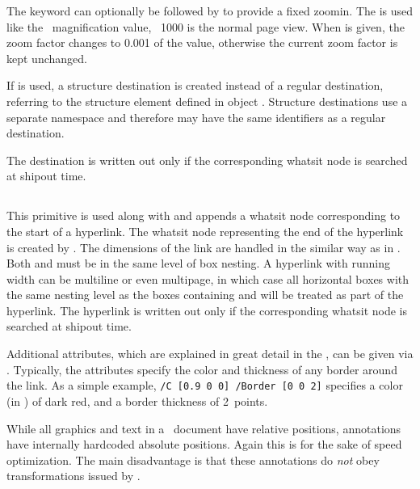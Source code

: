 \documentclass{pdftexmanual}
\begin{document}
The  keyword can optionally be followed by 
 to provide a fixed zoom\hyph in. The
 is used like the \TEX\ magnification value, \ie\
1000 is the normal page view. When   is
given, the zoom factor changes to 0.001 of the \Something{integer}
value, otherwise the current zoom factor is kept unchanged.

If   is used, a structure destination
is created instead of a regular destination, referring to the structure
element defined in object \Something{number}. Structure destinations use
a separate namespace and therefore may have the same identifiers as a
regular destination.

The destination is written out only if the corresponding whatsit node is
searched at shipout time.

\subsection{}

This primitive is used along with  and appends
a whatsit node corresponding to the start of a hyperlink. The whatsit
node representing the end of the hyperlink is created by
. The dimensions of the link are handled in the
similar way as in . Both  and
 must be in the same level of box nesting. A hyperlink
with running width can be multi\hyph line or even multi\hyph page, in which case
all horizontal boxes with the same nesting level as the boxes containing
\cs{pdfstartlink} and \cs{pdfendlink} will be treated as part of
the hyperlink. The hyperlink is written out only if the corresponding
whatsit node is searched at shipout time.

Additional attributes, which are explained in great detail in the
\PDFReference, can be given via \Something{attr spec}. Typically, the
attributes specify the color and thickness of any border around the
link. As a simple example, \verb|/C [0.9 0 0] /Border [0 0 2]| specifies
a color (in \RGB) of dark red, and a border thickness of 2~points.

While all graphics and text in a \PDF\ document have relative positions,
annotations have internally hard\hyph coded absolute positions. Again
this is for the sake of speed optimization. The main disadvantage is
that these annotations do \emph{not} obey transformations issued by
\type{\pdfliteral}.
\end{document}
